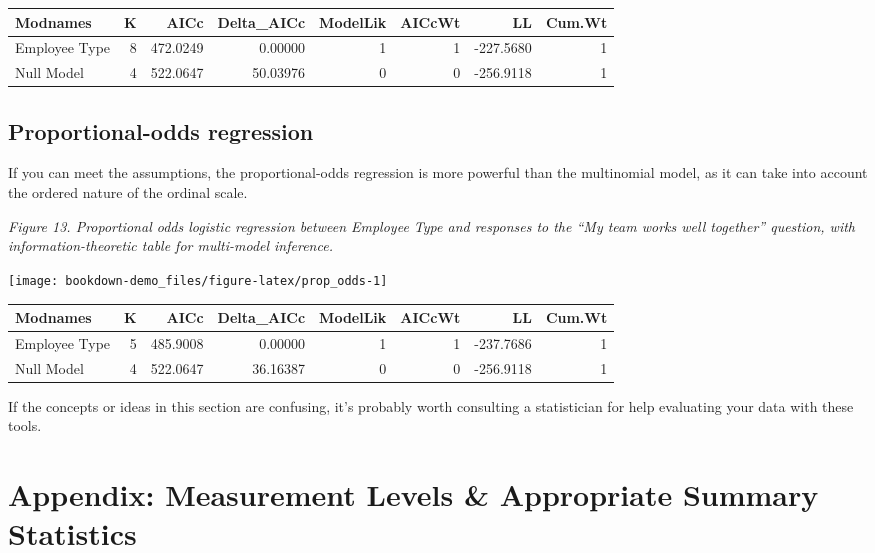 \documentclass[]{book}
\begin{document}
\begin{tabular}{l|r|r|r|r|r|r|r}
\hline
Modnames & K & AICc & Delta\_AICc & ModelLik & AICcWt & LL & Cum.Wt\\
\hline
Employee Type & 8 & 472.0249 & 0.00000 & 1 & 1 & -227.5680 & 1\\
\hline
Null Model & 4 & 522.0647 & 50.03976 & 0 & 0 & -256.9118 & 1\\
\hline
\end{tabular}

\section{Proportional-odds
regression}\label{proportional-odds-regression}

If you can meet the assumptions, the proportional-odds regression is
more powerful than the multinomial model, as it can take into account
the ordered nature of the ordinal scale.

\emph{Figure 13. Proportional odds logistic regression between Employee
Type and responses to the ``My team works well together'' question, with
information-theoretic table for multi-model inference.}

\begin{center}\texttt{[image: bookdown-demo\_files/figure-latex/prop\_odds-1]} \end{center}

\begin{tabular}{l|r|r|r|r|r|r|r}
\hline
Modnames & K & AICc & Delta\_AICc & ModelLik & AICcWt & LL & Cum.Wt\\
\hline
Employee Type & 5 & 485.9008 & 0.00000 & 1 & 1 & -237.7686 & 1\\
\hline
Null Model & 4 & 522.0647 & 36.16387 & 0 & 0 & -256.9118 & 1\\
\hline
\end{tabular}

If the concepts or ideas in this section are confusing, it's probably
worth consulting a statistician for help evaluating your data with these
tools.

\hypertarget{Appendix}{\chapter{Appendix: Measurement Levels \&
Appropriate Summary Statistics}\label{Appendix}}
\end{document}
